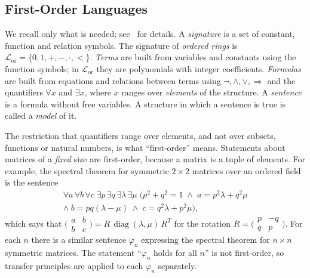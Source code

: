 \documentclass[12pt, a4paper]{report}
\theoremstyle{plain}
\theoremstyle{definition}
\theoremstyle{remark}
\theoremstyle{plain}
\DeclareMathOperator{\diag}{diag}
\begin{document}
\subsection{First-Order Languages}
\label{subsec:fol}
We recall only what is needed; see~\cite{Marker2002} for details. A \emph{signature} is a set of constant, function and relation symbols. The signature of \emph{ordered rings} is $\mathcal L_{\mathrm{or}}=\{0,1,+,-,\cdot,<\}$. \emph{Terms} are built from variables and constants using the function symbols; in $\mathcal L_{\mathrm{or}}$ they are polynomials with integer coefficients. \emph{Formulas} are built from equations and relations between terms using $\neg,\wedge,\vee,\Rightarrow$ and the quantifiers $\forall x$ and $\exists x$, where $x$ ranges over \emph{elements} of the structure. A \emph{sentence} is a formula without free variables. A structure in which a sentence is true is called a \emph{model} of it.

The restriction that quantifiers range over elements, and not over subsets, functions or natural numbers, is what ``first-order'' means. Statements about matrices of a \emph{fixed} size are first-order, because a matrix is a tuple of elements. For example, the spectral theorem for symmetric $2\times 2$ matrices over an ordered field is the sentence
\begin{multline*}
\forall a\,\forall b\,\forall c\;\exists p\,\exists q\,\exists\lambda\,\exists\mu\;\bigl(p^2+q^2=1\;\wedge\; a=p^2\lambda+q^2\mu\\ \wedge\; b=pq(\lambda-\mu)\;\wedge\; c=q^2\lambda+p^2\mu\bigr),
\end{multline*}
which says that $\bigl(\begin{smallmatrix}a&b\\b&c\end{smallmatrix}\bigr)=R\,\diag(\lambda,\mu)\,R^T$ for the rotation $R=\bigl(\begin{smallmatrix}p&-q\\q&p\end{smallmatrix}\bigr)$. For each $n$ there is a similar sentence $\varphi_n$ expressing the spectral theorem for $n\times n$ symmetric matrices. The statement ``$\varphi_n$ holds for all $n$'' is not first-order, so transfer principles are applied to each $\varphi_n$ separately.
\end{document}
